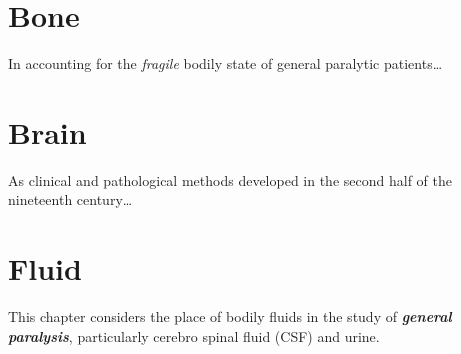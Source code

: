 \documentclass[
  openany]{book}
\begin{document}
\hypertarget{bone}{%
\chapter{Bone}\label{bone}}

In accounting for the \emph{fragile} bodily state of general paralytic patients\ldots{}

\hypertarget{brain}{%
\chapter{Brain}\label{brain}}

As clinical and pathological methods developed in the second half of the nineteenth century\ldots{}

\hypertarget{fluid}{%
\chapter{Fluid}\label{fluid}}

This chapter considers the place of bodily fluids in the study of \textbf{\emph{general paralysis}}, particularly cerebro spinal fluid (CSF) and urine.
\end{document}
